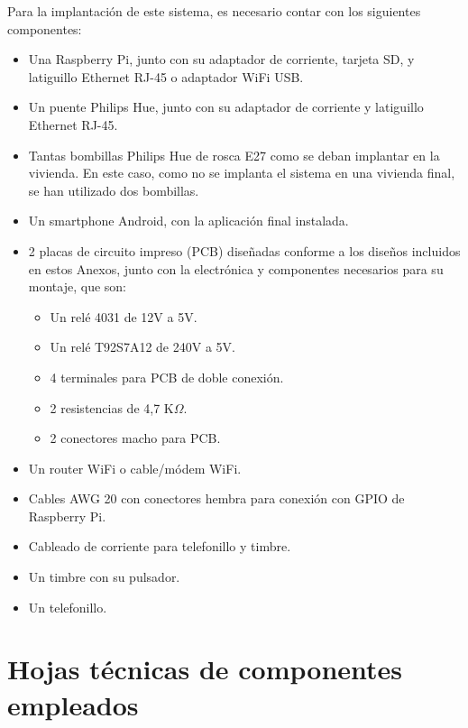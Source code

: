     Para la implantación de este sistema, es necesario contar con los siguientes componentes:
    \begin{itemize}
        \item Una Raspberry Pi, junto con su adaptador de corriente, tarjeta SD, y latiguillo Ethernet RJ-45 o adaptador WiFi USB.
        \item Un puente Philips Hue, junto con su adaptador de corriente y latiguillo Ethernet RJ-45.
        \item Tantas bombillas Philips Hue de rosca E27 como se deban implantar en la vivienda. En este caso, como no se implanta el sistema en una vivienda final, se han utilizado dos bombillas.
        \item Un smartphone Android, con la aplicación final instalada.
        \item 2 placas de circuito impreso (PCB) diseñadas conforme a los diseños incluidos en estos Anexos, junto con la electrónica y componentes necesarios para su montaje, que son:
            \begin{itemize}
                \item Un relé 4031 de 12V a 5V.
                \item Un relé T92S7A12 de 240V a 5V.
                \item 4 terminales para PCB de doble conexión.
                \item 2 resistencias de 4,7 K$\Omega$.
                \item 2 conectores macho para PCB.
            \end{itemize}
        \item Un router WiFi o cable/módem WiFi.
        \item Cables AWG 20 con conectores hembra para conexión con GPIO de Raspberry Pi.
        \item Cableado de corriente para telefonillo y timbre.
        \item Un timbre con su pulsador.
        \item Un telefonillo.
    \end{itemize}

\clearpage
\chapter{Hojas técnicas de componentes empleados}


